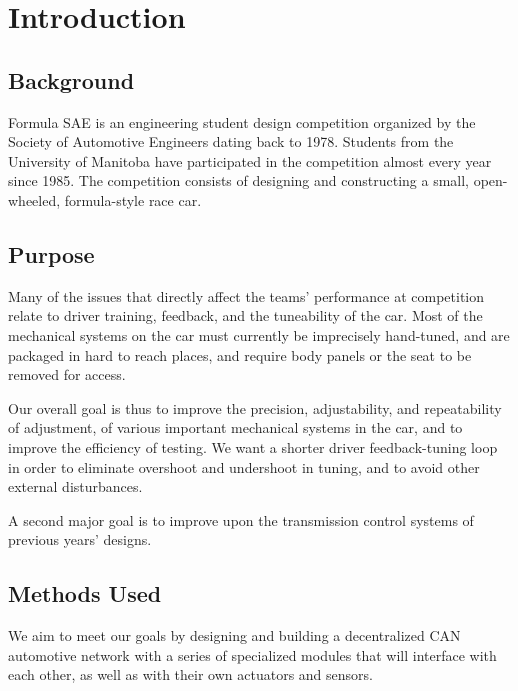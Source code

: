 %
%
%
%

\chapter{Introduction}

\section{Background}

Formula SAE is
an engineering student design competition organized by the Society
of Automotive Engineers dating back to 1978\cite{fsaehistory}. Students
from the University of Manitoba have participated in the competition
almost every year since 1985. The competition consists of designing
and constructing a small, open-wheeled, formula-style race car.

\section{Purpose}

Many of the issues that directly affect the teams' performance at
competition relate to driver training, feedback, and the tuneability
of the car. Most of the mechanical systems on the car must currently
be imprecisely hand-tuned, and are packaged in hard to reach places,
and require body panels or the seat to be removed for access.

Our overall goal is thus to improve the precision, adjustability, and
repeatability of adjustment, of various important mechanical systems
in the car, and to improve the efficiency of testing. We want a shorter
driver feedback-tuning loop in order to eliminate
overshoot and undershoot in tuning, and to avoid other external disturbances.

A second major goal is to improve upon the transmission control systems
of previous years' designs.


\section{Methods Used}

We aim to meet our goals by designing and building a decentralized CAN
automotive network with a series of specialized modules that will interface
with each other, as well as with their own actuators and sensors.